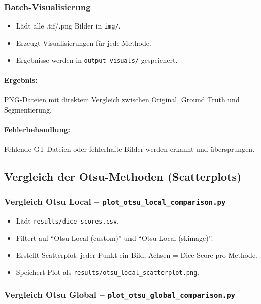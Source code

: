 \documentclass[a4paper,12pt]{article}
\begin{document}
\subsubsection*{Batch-Visualisierung}
\begin{itemize}
    \item Lädt alle .tif/.png Bilder in \texttt{img/}.
    \item Erzeugt Visualisierungen für jede Methode.
    \item Ergebnisse werden in \texttt{output\_visuals/} gespeichert.
\end{itemize}

\paragraph{Ergebnis:} PNG-Dateien mit direktem Vergleich zwischen Original, Ground Truth und Segmentierung.

\paragraph{Fehlerbehandlung:} Fehlende GT-Dateien oder fehlerhafte Bilder werden erkannt und übersprungen.

\vspace{1em}
\subsection{Vergleich der Otsu-Methoden (Scatterplots)}

\subsubsection*{Vergleich Otsu Local -- \texttt{plot\_otsu\_local\_comparison.py}}

\begin{itemize}
    \item Lädt \texttt{results/dice\_scores.csv}.
    \item Filtert auf ``Otsu Local (custom)'' und ``Otsu Local (skimage)''.
    \item Erstellt Scatterplot: jeder Punkt ein Bild, Achsen = Dice Score pro Methode.
    \item Speichert Plot als \texttt{results/otsu\_local\_scatterplot.png}.
\end{itemize}

\subsubsection*{Vergleich Otsu Global -- \texttt{plot\_otsu\_global\_comparison.py}}
\end{document}
